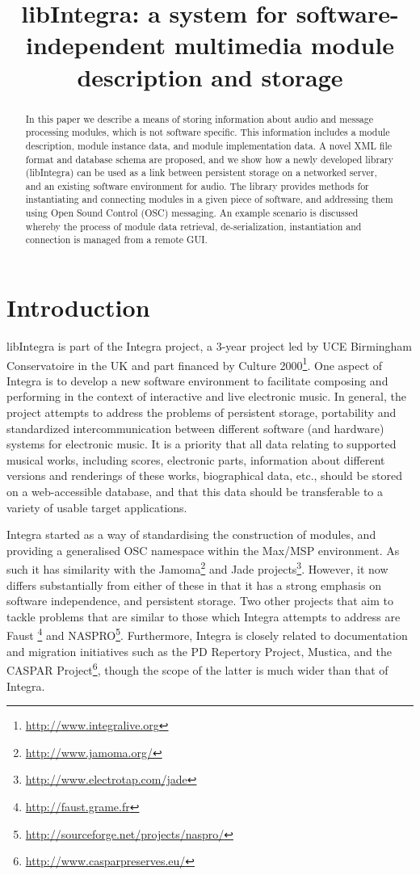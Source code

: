 \documentclass{article}
\title{libIntegra: a system for software-independent multimedia module description and storage}
\begin{document}
\maketitle

\begin{abstract}
In this paper we describe a means of storing information about audio and message processing modules, which is not software specific. This information includes a module description, module instance data, and module implementation data. A novel XML file format and database schema are proposed, and we show how a newly developed library (libIntegra) can be used as a link between persistent storage on a networked server, and an existing software environment for audio. The library provides methods for instantiating and connecting modules in a given piece of software, and addressing them using Open Sound Control (OSC) messaging. An example scenario is discussed whereby the process of module data retrieval, de-serialization, instantiation and connection is managed from a remote GUI.
\end{abstract}

\section{Introduction}\label{sec:introduction}

libIntegra is part of the Integra project, a 3-year project led by UCE Birmingham Conservatoire in the UK and part financed by Culture 2000\footnote{\url{http://www.integralive.org}}. One aspect of Integra is to develop a new software environment to facilitate composing and performing in the context of interactive and live electronic music. In general, the project attempts to address the problems of persistent storage, portability and standardized intercommunication between different software (and hardware) systems for electronic music. It is a priority that all data relating to supported musical works, including scores, electronic parts, information about different versions and renderings of these works, biographical data, etc., should be stored on a web-accessible database, and that this data should be transferable to a variety of usable target applications.

Integra started as a way of standardising the construction of modules, and providing a generalised OSC namespace within the Max/MSP environment. As such it has similarity with the Jamoma\cite{Place:06}\footnote{\url{http://www.jamoma.org/}} and Jade projects\footnote{\url{http://www.electrotap.com/jade}}. However, it now differs substantially from either of these in that it has a strong emphasis on software independence, and persistent storage. Two other projects that aim to tackle problems that are similar to those which Integra attempts to address are Faust \cite{Orlarey:04}\cite{Orlarey:02}\footnote{\url{http://faust.grame.fr}} and NASPRO\footnote{\url{http://sourceforge.net/projects/naspro/}}. Furthermore, Integra is closely related to documentation and migration initiatives such as the PD Repertory Project\cite{Puckette:01}, Mustica\cite{Bachimont:03}, and the CASPAR Project\footnote{\url{http://www.casparpreserves.eu/}}, though the scope of the latter is much wider than that of Integra.
\end{document}
